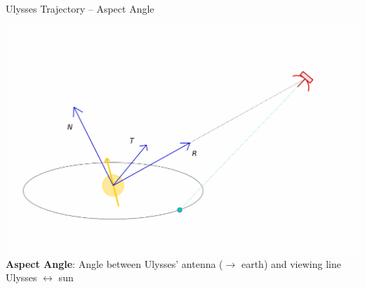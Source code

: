 \documentclass{beamer}
\begin{document}
\begin{frame}{Ulysses Trajectory -- Aspect Angle}
	\begin{center}
	\includegraphics[scale=.5]{Pics/aa1.pdf}
	\vspace{0.3cm}
	\textbf{Aspect Angle}: Angle between Ulysses' antenna ($\rightarrow$ earth) and  viewing line Ulysses $\leftrightarrow$ sun
\end{center}
\end{frame}
\end{document}
